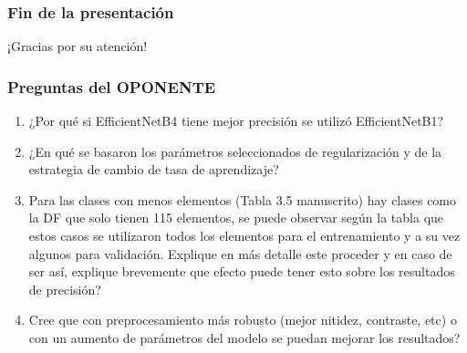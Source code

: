 \documentclass{beamer}
\begin{document}

\begin{frame}
  \frametitle{Fin de la presentación}
  \begin{center}
    \Huge{¡Gracias por su atención!}
  \end{center}
\end{frame}


\begin{frame}
  \frametitle{Preguntas del OPONENTE}

      \begin{enumerate}
        \item<1-> ¿Por qué si EfficientNetB4 tiene mejor precisión se utilizó EfficientNetB1?
        \item<2-> ¿En qué se basaron los parámetros seleccionados de regularización y de la estrategia de cambio de tasa de aprendizaje?
        \item<0> Para las clases con menos elementos (Tabla 3.5 manuscrito) hay clases como la DF que solo tienen 115 elementos, se puede observar según la tabla que estos casos se utilizaron todos los elementos para el entrenamiento y a su vez algunos para validación. Explique en más detalle este proceder  y en caso de ser así, explique brevemente que efecto puede tener esto sobre los resultados de precisión?
        \item<0> Cree que con preprocesamiento más robusto (mejor nitidez, contraste, etc) o con un aumento de parámetros del modelo se puedan mejorar los resultados?
      \end{enumerate}
      
\end{frame}
\end{document}
